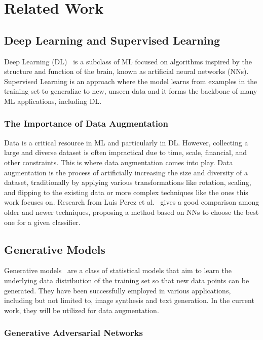 \chapter{Related Work}

\section{Deep Learning and Supervised Learning}

Deep Learning (DL)~\cite{deeplearning} is a subclass of ML focused on algorithms inspired by the structure and function of the brain, known as artificial neural networks (NNs). Supervised Learning is an approach where the model learns from examples in the training set to generalize to new, unseen data and it forms the backbone of many ML applications, including DL.

\subsection{The Importance of Data Augmentation}

Data is a critical resource in ML and particularly in DL. However, collecting a large and diverse dataset is often impractical due to time, scale, financial, and other constraints. This is where data augmentation comes into play. Data augmentation is the process of artificially increasing the size and diversity of a dataset, traditionally by applying various transformations like rotation, scaling, and flipping to the existing data or more complex techniques like the ones this work focuses on. Research from Luis Perez et al.~\cite{perez} gives a good comparison among older and newer techniques, proposing a method based on NNs to choose the best one for a given classifier. 

\section{Generative Models}

Generative models~\cite{GenerativeModel} are a class of statistical models that aim to learn the underlying data distribution of the training set so that new data points can be generated. They have been successfully employed in various applications, including but not limited to, image synthesis and text generation. In the current work, they will be utilized for data augmentation.

\subsection{Generative Adversarial Networks}

